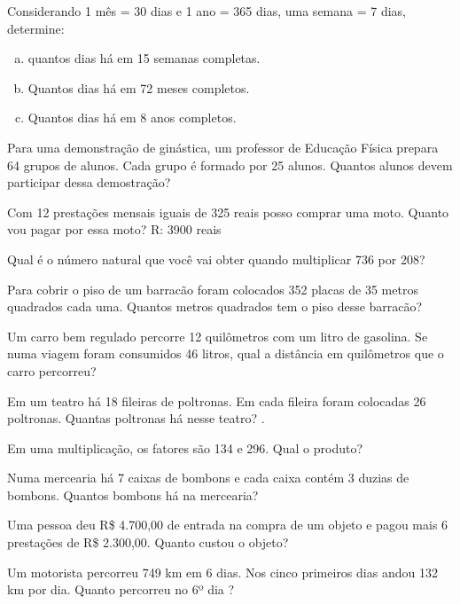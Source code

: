 \item  Considerando 1 mês = 30 dias e 1 ano = 365 dias, uma semana = 7 dias, determine:
\begin{enumerate}[a)]
	\item quantos dias há em 15 semanas completas.
	\item Quantos dias há em 72 meses completos.
	\item Quantos dias há em 8 anos completos.
\end{enumerate}  

\item Para uma demonstração de ginástica, um professor de Educação Física prepara 64 grupos de alunos. Cada grupo é formado por 25 alunos. Quantos alunos devem participar dessa demostração?

\item Com 12 prestações mensais iguais de 325 reais posso comprar uma moto. Quanto vou pagar por essa moto? R: 3900 reais

\item Qual é o número natural que você vai obter quando multiplicar 736 por 208?

\item  Para cobrir o piso de um barracão foram colocados 352 placas de 35 metros quadrados cada uma. Quantos metros quadrados tem o piso desse barracão?

\item Um carro bem regulado percorre 12 quilômetros com um litro de gasolina. Se numa viagem foram consumidos 46 litros, qual a distância em quilômetros que o carro percorreu? 

\item Em um teatro há 18 fileiras de poltronas. Em cada fileira foram colocadas 26 poltronas. Quantas poltronas há nesse teatro? 
.
\item Em uma multiplicação, os fatores são 134 e 296. Qual o produto?

\item Numa mercearia há 7 caixas de bombons e cada caixa contém 3 duzias de bombons. Quantos bombons há na mercearia? 

\item Uma pessoa deu R\$ 4.700,00 de entrada na compra de um objeto e pagou mais 6 prestações de R\$ 2.300,00. Quanto custou o objeto?

\item Um motorista percorreu 749 km em 6 dias. Nos cinco primeiros dias andou 132 km por dia. Quanto percorreu no 6º dia ?

